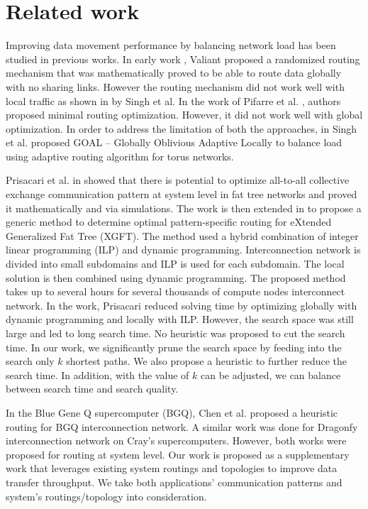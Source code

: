 \section{Related work}
\label{sec:relatedwork}

Improving data movement performance by balancing network load has been studied in previous works. In early work \cite{Valiant81:Routing}, Valiant proposed a randomized routing mechanism that was mathematically proved to be able to route data globally with no sharing links. However the routing mechanism did not work well with local traffic as shown in \cite{singh2003:GOAL} by Singh et al. In the work of Pifarre et al. \cite{Pifarre91}, authors proposed minimal routing optimization. However, it did not work well with global optimization. In order to address the limitation of both the approaches, in \cite{singh2003:GOAL} Singh et al. proposed GOAL -- Globally Oblivious Adaptive Locally to balance load using adaptive routing algorithm for torus networks. %

Prisacari et al. in \cite{Prisacari13a} showed that there is potential to optimize all-to-all collective exchange communication pattern at system level in fat tree networks and proved it mathematically and via simulations. The work is then extended in \cite{Prisacari13b} to propose a generic method to determine optimal pattern-specific routing for eXtended Generalized Fat Tree (XGFT). The method used a hybrid combination of integer linear programming (ILP) and dynamic programming. Interconnection network is divided into small subdomains and ILP is used for each subdomain. The local solution is then combined using dynamic programming. The proposed method takes up to several hours for several thousands of compute nodes interconnect network. In the work, Prisacari reduced solving time by optimizing globally with dynamic programming and locally with ILP. However, the search space was still large and led to long search time. No heuristic was proposed to cut the search time. In our work, we significantly prune the search space by feeding into the search only $k$ shortest paths. We also propose a heuristic to further reduce the search time. In addition, with the value of $k$ can be adjusted, we can balance between search time and search quality. 

In the Blue Gene Q supercomputer (BGQ), Chen et al. \cite{Chen:BGQ} proposed a heuristic routing for BGQ interconnection network. A similar work was done for Dragonfy interconnection network on Cray's supercomputers. However, both works were proposed for routing at system level. Our work is proposed as a supplementary work that leverages existing system routings and topologies to improve data transfer throughput. We take both applications' communication patterns and system's routings/topology into consideration. 

